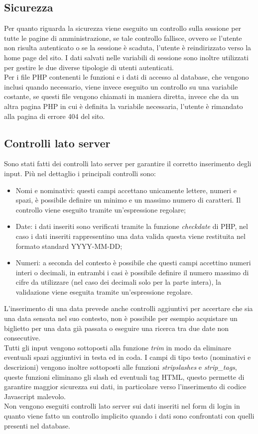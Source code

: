 \documentclass[10pt,a4paper,onecolumn]{article}
\begin{document}
\subsection{Sicurezza}
Per quanto riguarda la sicurezza viene eseguito un controllo sulla sessione per tutte le pagine di amministrazione, se tale controllo fallisce, ovvero se l'utente non risulta autenticato o se la sessione è scaduta, l'utente è reindirizzato verso la home page del sito. I dati salvati nelle variabili di sessione sono inoltre utilizzati per gestire le due diverse tipologie di utenti autenticati.\\
Per i file PHP contenenti le funzioni e i dati di accesso al database, che vengono inclusi quando necessario, viene invece eseguito un controllo su una variabile costante, se questi file vengono chiamati in maniera diretta, invece che da un altra pagina PHP in cui è definita la variabile necessaria, l'utente è rimandato alla pagina di errore 404 del sito.\\

\subsection{Controlli lato server}
Sono stati fatti dei controlli lato server per garantire il corretto inserimento degli input. Più nel dettaglio i principali controlli sono:
\begin{itemize}
\item Nomi e nominativi: questi campi accettano unicamente lettere, numeri e spazi, è possibile definire un minimo e un massimo numero di caratteri. Il controllo viene eseguito tramite un'espressione regolare;
\item Date: i dati inseriti sono verificati tramite la funzione \textit{checkdate} di PHP, nel caso i dati inseriti rappresentino una data valida questa viene restituita nel formato standard YYYY-MM-DD;
\item Numeri: a seconda del contesto è possibile che questi campi accettino numeri interi o decimali, in entrambi i casi è possibile definire il numero massimo di cifre da utilizzare (nel caso dei decimali solo per la parte intera), la validazione viene eseguita tramite un'espressione regolare.
\end{itemize}
L'inserimento di una data prevede anche controlli aggiuntivi per accertare che sia una data sensata nel suo contesto, non è possibile per esempio acquistare un biglietto per una data già passata o eseguire una ricerca tra due date non consecutive.\\
Tutti gli input vengono sottoposti alla funzione \textit{trim} in modo da eliminare eventuali spazi aggiuntivi in testa ed in coda. I campi di tipo testo (nominativi e descrizioni) vengono inoltre sottoposti alle funzioni \textit{stripslashes} e \textit{strip\_tags}, queste funzioni eliminano gli slash ed eventuali tag HTML, questo permette di garantire maggior sicurezza sui dati, in particolare verso l'inserimento di codice Javascript malevolo.\\
Non vengono eseguiti controlli lato server sui dati inseriti nel form di login in quanto viene fatto un controllo implicito quando i dati sono confrontati con quelli presenti nel database.
\end{document}
